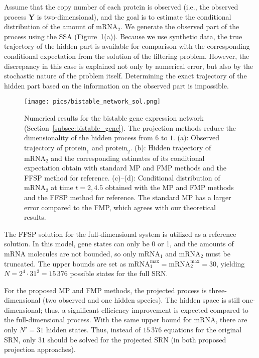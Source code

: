Assume that the copy number of each protein is observed (i.e., the observed process $\boldsymbol{Y}$ is two-dimensional), and the goal is to estimate the conditional distribution of the amount of $\text{mRNA}_2$. We generate the observed part of the process using the \ac{SSA} (Figure~\ref{fig:bistable_gene_sol}(a)). Because we use synthetic data, the true trajectory of the hidden part is available for comparison with the corresponding conditional expectation from the solution of the filtering problem. However, the discrepancy in this case is explained not only by numerical error, but also by the stochastic nature of the problem itself. Determining the exact trajectory of the hidden part based on the information on the observed part is impossible.

\begin{figure}
    \centering
    \texttt{[image: pics/bistable\_network\_sol.png]}
    \caption{
    Numerical results for the bistable gene expression network (Section~\ref{subsec:bistable_gene}). The projection methods reduce the dimensionality of the hidden process from $6$ to $1$.
     (a): Observed trajectory of $\text{protein}_1$ and $\text{protein}_2$. 
     (b): Hidden trajectory of $\text{mRNA}_2$ and the corresponding estimates of its conditional expectation obtain with standard \ac{MP} and \ac{FMP} methods and the \ac{FFSP} method for reference. 
     (c)--(d): Conditional distribution of $\text{mRNA}_2$ at time $t = 2, 4.5$ obtained with the \ac{MP} and \ac{FMP} methods and the \ac{FFSP} method for reference. 
     The standard \ac{MP} has a larger error compared to the \ac{FMP}, which agrees with our theoretical results. 
     }
    \label{fig:bistable_gene_sol}
\end{figure}

The \ac{FFSP} solution for the full-dimensional system is utilized as a reference solution. In this model, gene states can only be 0 or 1, and the amounts of mRNA molecules are not bounded, so only mRNA$_1$ and mRNA$_2$ must be truncated. The upper bounds are set as $\text{mRNA}_1^{\text{max}} = \text{mRNA}_2^{\text{max}} = 30$, yielding $N = 2^4 \cdot 31^2 = 15 \, 376$ possible states for the full \ac{SRN}. 

For the proposed \ac{MP} and \ac{FMP} methods, the projected process is three-dimensional (two observed  and one hidden species). The hidden space is still one-dimensional; thus, a significant efficiency improvement is expected compared to the full-dimensional process. With the same upper bound for mRNA, there are only $N' = 31$ hidden states. Thus, instead of $15 \, 376$ equations for the original \ac{SRN}, only $31$ should be solved for the projected \ac{SRN} (in both proposed projection approaches).
 
